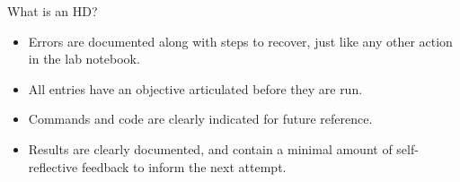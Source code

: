 \documentclass[aspectratio=43, 11pt]{beamer} %
\begin{document}
\begin{frame}{What is an HD?}
\begin{itemize}[label=\textbullet]

\item Errors are documented along with steps to recover, just like any other action in the lab notebook. 
\item All entries have an objective articulated before they are run. 
\item Commands and code are clearly indicated for future reference. 
\item Results are clearly documented, and contain a minimal amount of self-reflective feedback to inform the next attempt.
\end{itemize}

\end{frame}
\end{document}
